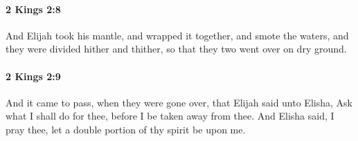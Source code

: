 		\paragraph{2 Kings 2:8} %
			\label{2KINGS-2-8}

			And Elijah took his mantle, and wrapped it together, and smote the waters, and they were divided hither and thither, so that they two went over on dry ground.


		\paragraph{2 Kings 2:9} %
			\label{2KINGS-2-9}

			And it came to pass, when they were gone over, that Elijah said unto Elisha, Ask what I shall do for thee, before I be taken away from thee. And Elisha said, I pray thee, let a double portion of thy spirit be upon me.


